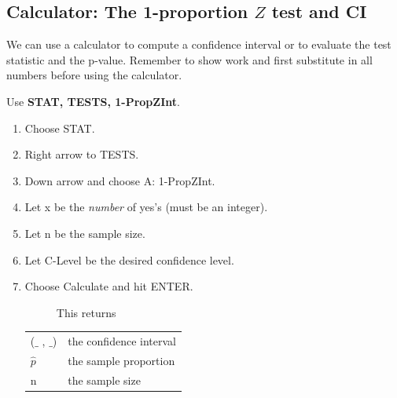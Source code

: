 \subsection{Calculator: The 1-proportion $Z$ test and CI\vspace{-3mm}}

We can use a calculator to compute a confidence interval or to evaluate the test statistic and the p-value. Remember to show work and first substitute in all numbers before using the calculator.

\begin{termBox}{
Use \textbf{STAT, TESTS, 1-PropZInt}.
\begin{enumerate}
\setlength{\itemsep}{0mm}
\item Choose STAT.
\item Right arrow to TESTS.
\item Down arrow and choose A: 1-PropZInt.
\item Let x be the \emph{number} of yes's (must be an integer).
\item Let n be the sample size.
\item Let C-Level be the desired confidence level.
\item Choose Calculate and hit ENTER.
\begin{description}
\item[] This returns
\end{description}
\begin{tabular}{l l}
($\_$ , $\_$)
	&\quad  the confidence interval \\
$\hat{p}$
	&\quad	the sample proportion \\
n
	&\quad	the sample size
\end{tabular}
\end{enumerate}
}
\end{termBox}

